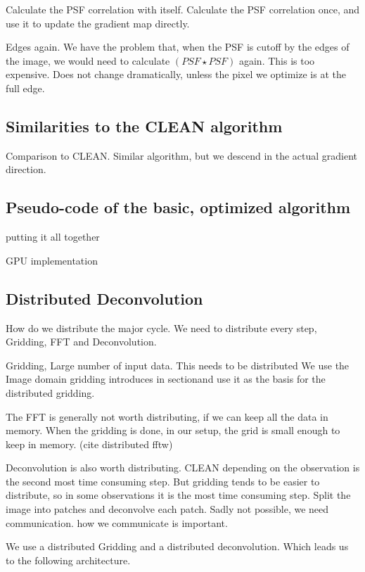 Calculate the PSF correlation with itself. Calculate the PSF correlation once, and use it to update the gradient map directly.

Edges again. We have the problem that, when the PSF is cutoff by the edges of the image, we would need to calculate $(PSF \star PSF)$ again. This is too expensive. Does not change dramatically, unless the pixel we optimize is at the full edge.


\subsection{Similarities to the CLEAN algorithm}

Comparison to CLEAN. Similar algorithm, but we descend in the actual gradient direction.

\subsection{Pseudo-code of the basic, optimized algorithm}

putting it all together




GPU implementation




\subsection{Distributed Deconvolution}
How do we distribute the major cycle. We need to distribute every step, Gridding, FFT and Deconvolution.

Gridding, Large number of input data. This needs to be distributed
We use the Image domain gridding introduces in sectionand use it as the basis for the distributed gridding.

The FFT is generally not worth distributing, if we can keep all the data in memory. When the gridding is done, in our setup, the grid is small enough to keep in memory. (cite distributed fftw)

Deconvolution is also worth distributing. CLEAN depending on the observation is the second most time consuming step. But gridding tends to be easier to distribute, so in some observations it is the most time consuming step.
Split the image into patches and deconvolve each patch.
Sadly not possible, we need communication. how we communicate is important.

We use a distributed Gridding and a distributed deconvolution. Which leads us to the following architecture.

